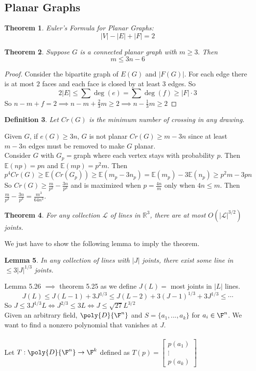 \documentclass[a4paper]{article}
\newtheorem{thm}{Theorem}[section]
\newtheorem{lem}[thm]{Lemma}
\newtheorem{defn}[thm]{Definition}
\begin{document}
\subsection*{Planar Graphs}
\begin{thm}
    Euler's Formula for Planar Graphs: $$|V|-|E|+|F|=2$$
\end{thm}
\begin{thm}
    Suppose $G$ is a connected planar graph with $m\geq 3.$ Then $$m\leq 3n-6$$
\end{thm}
\begin{proof}
    Consider the bipartite graph of $E(G)$ and $|F(G)|.$ For each edge there is at most $2$ faces and each face is closed by at least $3$ edges. So $$2|E|\leq \sum \deg(e)=\sum\deg(f)\geq |F|\cdot 3$$
    So $n-m+f=2\implies n-m+\frac{2}{3}m\geq 2\implies n-\frac{1}{3}m\geq 2$ 
\end{proof}
\begin{defn}
    Let $Cr(G)$ is the minimum number of crossing in any drawing.
\end{defn}
\noindent Given $G$, if $e(G)\geq 3n$, $G$ is not planar $Cr(G)\geq m-3n$ since at least $m-3n$ edges must be removed to make $G$ planar. \\
Consider $G$ with $G_p=$graph where each vertex stays with probability $p.$ 
Then $\mathbb{E}(np)=pn$ and $\mathbb{E}(mp)=p^2m$. Then $$p^4Cr(G)\geq \mathbb{E}(Cr(G_p))\geq \mathbb{E}(m_p-3n_p)=\mathbb{E}(m_p)-3\mathbb{E}(n_p)\geq p^2m-3pn$$
So $Cr(G)\geq \frac{m}{p^2}-\frac{3n}{p^3}$ and is maximized when $p=\frac{4n}{m}$ only when $4n\leq m.$ Then $\frac{m}{p^2}-\frac{3n}{p^3}=\frac{m^3}{64n^2}.$ \\
\begin{thm}
    For any collection $\mathcal{L}$ of lines in $\mathbb{R}^3$, there are at most $O(|\mathcal{L}|^{3/2})$ joints. 
\end{thm}
\noindent We just have to show the following lemma to imply the theorem.
\begin{lem}
    In any collection of lines with $|J|$ joints, there exist some line in $\leq 3|J|^{1/3}$ joints. 
 \end{lem}
\noindent Lemma 5.26 $\implies$ theorem 5.25 as we define $J(L)=$ most joints in $|L|$ lines.
$$J(L)\leq J(L-1)+3J^{1/3}\leq J(L-2)+3(J-1)^{1/3}+3J^{1/3}\leq \cdots$$
So $J\leq 3J^{1/3}L\iff J^{2/3}\leq 3L\iff J\leq \sqrt{27}L^{3/2}$\\
Given an arbitrary field, $\poly{D}{\F^n}$ and $S=\{a_1,...,a_k\}$ for $a_i\in \F^n$. We want to find a nonzero polynomial that vanishes at $J.$\\\\ Let $T:\poly{D}{\F^n}\to \F^k$ defined as $T(p)=\begin{bmatrix}
    p(a_1)\\ \vdots \\ p(a_k)
\end{bmatrix}$\\
\end{document}
